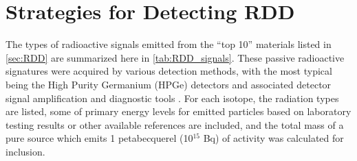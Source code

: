 \documentclass{report}
\begin{document}




\section{Strategies for Detecting RDD}
 

The types of radioactive signals emitted from the \enquote{top 10} materials listed in \autoref{sec:RDD} are summarized here in \autoref{tab:RDD_signals}.  These passive radioactive signatures were acquired by various detection methods, with the most typical being the High Purity Germanium (HPGe) detectors and associated detector signal amplification and diagnostic tools \cite{Glaser2007}.  For each isotope, the radiation types are listed, some of primary energy levels for emitted particles based on laboratory testing results or other available references are included, and the total mass of a pure source which emits 1 petabecquerel (10\(^{15}\) Bq) of activity was calculated for inclusion. 
\end{document}
